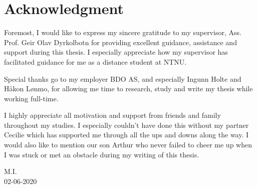 \chapter*{Acknowledgment}

Foremost, I would like to express my sincere gratitude to my supervisor, Ass. Prof. Geir Olav Dyrkolbotn for providing excellent guidance, assistance and support during this thesis. I especially appreciate how my supervisor has facilitated guidance for me as a distance student at NTNU.

Special thanks go to my employer BDO AS, and especially Ingunn Holte and Håkon Lønmo, for allowing me time to research, study and write my thesis while working full-time.

I highly appreciate all motivation and support from friends and family throughout my studies. I especially couldn't have done this without my partner Cecilie which has supported me through all the ups and downs along the way. I would also like to mention our son Arthur who never failed to cheer me up when I was stuck or met an obstacle during my writing of this thesis.

\begin{flushright}
M.I.\\
02-06-2020\\[1pc]
\end{flushright}